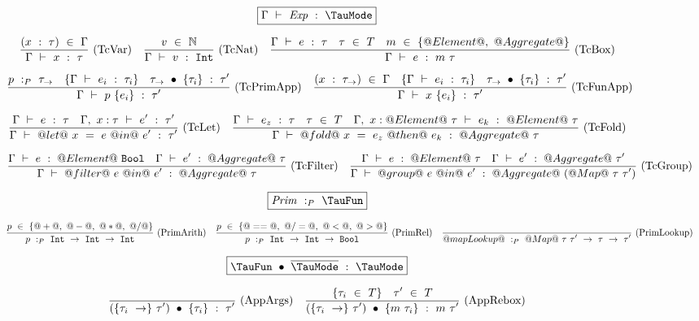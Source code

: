 
\begin{figure*}


$$
\boxed{\Typecheck{\Gamma}{\mi{Exp}}{\TauMode}}
$$


$$
\enskip \frac {\displaystyle 
    (x~:~\tau)~\in~\Gamma
} {\displaystyle  
    \Gamma ~\vdash~ x~:~\tau
} \  \mbox{(TcVar)} \enskip
\enskip \frac {\displaystyle 
  v~\in~\mathbb{N}
} {\displaystyle  
    \Gamma ~\vdash~ v~:~\mathtt{Int}
} \  \mbox{(TcNat)} \enskip
\enskip \frac {\displaystyle 
  \Gamma ~\vdash~ e~:~\tau
  \quad
  \tau~\in~T
  \quad
  m~\in~\{@Element@,~@Aggregate@\}
} {\displaystyle  
    \Gamma ~\vdash~ e~:~m~\tau
} \  \mbox{(TcBox)} \enskip
$$

$$
\enskip \frac {\displaystyle 
    p~:_P~\tau_\to
    \quad
    \{ \Gamma ~\vdash~ e_i~:~\tau_i \}
    \quad
    \tau_\to~\bullet~\{\tau_i\}~:~\tau'
} {\displaystyle  
    \Gamma ~\vdash~ p~\{e_i\}~:~\tau'
} \  \mbox{(TcPrimApp)} \enskip
\enskip \frac {\displaystyle 
    (x~:~\tau_\to)~\in~\Gamma
    \quad
    \{ \Gamma ~\vdash~ e_i~:~\tau_i \}
    \quad
    \tau_\to~\bullet~\{\tau_i\}~:~\tau'
} {\displaystyle  
    \Gamma ~\vdash~ x~\{e_i\}~:~\tau'
} \  \mbox{(TcFunApp)} \enskip
$$

$$
\enskip \frac {\displaystyle 
  \Gamma ~\vdash~ e~:~\tau
  \quad
  \Gamma,~x:\tau ~\vdash~ e'~:~\tau'
} {\displaystyle 
  \Gamma ~\vdash~ @let@~x~=~e~@in@~e'~:~\tau'
} \  \mbox{(TcLet)} \enskip
\enskip \frac {\displaystyle 
  \Gamma ~\vdash~ e_z~:~\tau
  \quad
  \tau~\in~T
  \quad
  \Gamma,~x:@Element@~\tau ~\vdash~ e_k~:~@Element@~\tau
} {\displaystyle 
  \Gamma ~\vdash~ @fold@~x~=~e_z~@then@~e_k~:~@Aggregate@~\tau
} \  \mbox{(TcFold)} \enskip
$$

$$
\enskip \frac {\displaystyle 
  \Gamma ~\vdash~ e~:~@Element@~\mathtt{Bool}
  \quad
  \Gamma ~\vdash~ e'~:~@Aggregate@~\tau
} {\displaystyle 
  \Gamma ~\vdash~ @filter@~e~@in@~e'~:~@Aggregate@~\tau
} \  \mbox{(TcFilter)} \enskip
\enskip \frac {\displaystyle 
  \Gamma ~\vdash~ e~:~@Element@~\tau
  \quad
  \Gamma ~\vdash~ e'~:~@Aggregate@~\tau'
} {\displaystyle 
  \Gamma ~\vdash~ @group@~e~@in@~e'~:~@Aggregate@~(@Map@~\tau~\tau')
} \  \mbox{(TcGroup)} \enskip
$$


$$
\boxed{\TypecheckP{\mi{Prim}}{\TauFun}}
$$

$$
\enskip \frac {\displaystyle 
  p~\in~\{@+@,~@-@,~@*@,~@/@\}
} {\displaystyle 
  p~:_P~\mathtt{Int}~\to~\mathtt{Int}~\to~\mathtt{Int}
} \  \mbox{(PrimArith)} \enskip
\enskip \frac {\displaystyle 
  p~\in~\{@==@,~@/=@,~@<@,~@>@\}
} {\displaystyle 
  p~:_P~\mathtt{Int}~\to~\mathtt{Int}~\to~\mathtt{Bool}
} \  \mbox{(PrimRel)} \enskip
\enskip \frac {\displaystyle } {\displaystyle 
  @mapLookup@~:_P~@Map@~\tau~\tau'~\to~\tau~\to~\tau'
} \  \mbox{(PrimLookup)} \enskip
$$

$$
\boxed{\TypecheckApp{\TauFun}{\ov{\TauMode}}{\TauMode}}
$$

$$
\enskip \frac {\displaystyle 
} {\displaystyle 
  (\{\tau_i~\to\}~\tau')~\bullet~\{\tau_i\}~:~\tau'
} \  \mbox{(AppArgs)} \enskip
\enskip \frac {\displaystyle 
  \{\tau_i~\in~T\}
  \quad
  \tau'~\in~T
} {\displaystyle 
  (\{\tau_i~\to\}~\tau')~\bullet~\{m~\tau_i\}~:~m~\tau'
} \  \mbox{(AppRebox)} \enskip
$$


\end{figure*}
